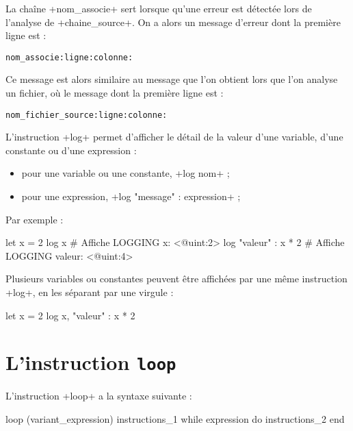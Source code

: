 La chaîne \ggs+nom_associe+ sert lorsque qu'une erreur est détectée lors de l'analyse de \ggs+chaine_source+. On a alors un message d'erreur dont la première ligne est :

\texttt{nom\_associe:ligne:colonne:}

Ce message est alors similaire au message que l'on obtient lors que l'on analyse un fichier, où le message dont la première ligne est :

\texttt{nom\_fichier\_source:ligne:colonne:}














L'instruction \ggs+log+ permet d'afficher le détail de la valeur d'une variable, d'une constante ou d'une expression :
\begin{itemize}
  \item pour une variable ou une constante, \ggs+log nom+ ;
  \item pour une expression, \ggs+log "message" : expression+ ;
\end{itemize}

Par exemple :
\begin{galgas}
let x = 2
log x # Affiche LOGGING x: <@uint:2>
log "valeur" : x * 2 # Affiche LOGGING valeur: <@uint:4>
\end{galgas}

Plusieurs variables ou constantes peuvent être affichées par une même instruction \ggs+log+, en les séparant par une virgule :
\begin{galgas}
let x = 2
log x, "valeur" : x * 2
\end{galgas}














\section{L'instruction \texttt{loop}}


L'instruction \ggs+loop+ a la syntaxe suivante :
\begin{galgasbox}
loop (variant_expression)
  instructions_1
while expression do
  instructions_2
end
\end{galgasbox}


